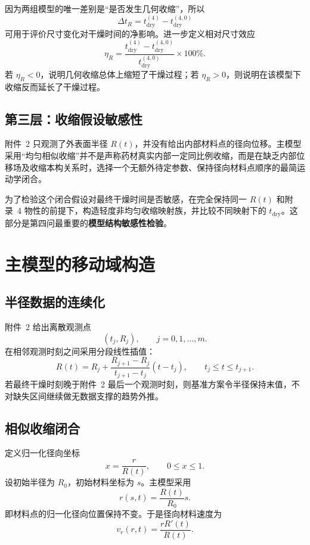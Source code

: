 \documentclass[UTF8,a4paper,12pt]{ctexart}
\begin{document}
因为两组模型的唯一差别是“是否发生几何收缩”，所以
\[
\boxed{
\Delta t_R
=t_{\mathrm{dry}}^{(4)}-t_{\mathrm{dry}}^{(4,0)}
}
\]
可用于评价尺寸变化对干燥时间的净影响。进一步定义相对尺寸效应
\begin{equation}
\eta_R
=
\frac{t_{\mathrm{dry}}^{(4)}-t_{\mathrm{dry}}^{(4,0)}}
{t_{\mathrm{dry}}^{(4,0)}}\times100\%.
\label{eq:etaR}
\end{equation}
若 $\eta_R<0$，说明几何收缩总体上缩短了干燥过程；若 $\eta_R>0$，则说明在该模型下收缩反而延长了干燥过程。

\subsection{第三层：收缩假设敏感性}

附件~2 只观测了外表面半径 $R(t)$，并没有给出内部材料点的径向位移。主模型采用“均匀相似收缩”并不是声称药材真实内部一定同比例收缩，而是在缺乏内部位移场及收缩本构关系时，选择一个无额外待定参数、保持径向材料点顺序的最简运动学闭合。

为了检验这个闭合假设对最终干燥时间是否敏感，在完全保持同一 $R(t)$ 和附录~4 物性的前提下，构造轻度非均匀收缩映射族，并比较不同映射下的 $t_{\mathrm{dry}}$。这部分是第四问最重要的\textbf{模型结构敏感性检验}。

\section{主模型的移动域构造}

\subsection{半径数据的连续化}

附件~2 给出离散观测点
\[
(t_j,R_j),\qquad j=0,1,\ldots,m.
\]
在相邻观测时刻之间采用分段线性插值：
\begin{equation}
R(t)=R_j+
\frac{R_{j+1}-R_j}{t_{j+1}-t_j}(t-t_j),
\qquad t_j\le t\le t_{j+1}.
\label{eq:Rinterp}
\end{equation}
若最终干燥时刻晚于附件~2 最后一个观测时刻，则基准方案令半径保持末值，不对缺失区间继续做无数据支撑的趋势外推。

\subsection{相似收缩闭合}

定义归一化径向坐标
\begin{equation}
x=\frac{r}{R(t)},\qquad 0\le x\le1.
\label{eq:xdef}
\end{equation}
设初始半径为 $R_0$，初始材料坐标为 $s$。主模型采用
\begin{equation}
r(s,t)=\frac{R(t)}{R_0}s.
\label{eq:similar}
\end{equation}
即材料点的归一化径向位置保持不变。于是径向材料速度为
\begin{equation}
v_r(r,t)=\frac{rR'(t)}{R(t)}.
\label{eq:velocity}
\end{equation}
\end{document}
